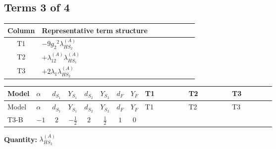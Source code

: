 \documentclass[8pt]{article}
\begin{document}
\begin{landscape}
\subsection*{Terms 3 of 4}
\begin{center}
\begin{tabular}{@{}c >{\raggedright\arraybackslash}p{0.82\linewidth}@{}}
\toprule
Column & Representative term structure \\
\midrule
T1 & \(\displaystyle -9 {g_2}^2 {\lambda_{HS_2}^{(A)}}\) \\
\midrule
T2 & \(\displaystyle +{\lambda_{12}^{(A)}} {\lambda_{HS_1}^{(A)}}\) \\
\midrule
T3 & \(\displaystyle +2 {\lambda_1} {\lambda_{HS_2}^{(A)}}\) \\
\midrule
\bottomrule
\end{tabular}
\end{center}
\smallskip
\tiny
\begin{longtable}{@{}llcccccc >{\raggedright\arraybackslash}p{0.21\linewidth} >{\raggedright\arraybackslash}p{0.21\linewidth} >{\raggedright\arraybackslash}p{0.21\linewidth}@{}}
\toprule
Model & $\alpha$ & $d_{S_1}$ & $Y_{S_1}$ & $d_{S_2}$ & $Y_{S_2}$ & $d_F$ & $Y_F$ & T1 & T2 & T3 \\
\midrule
\endfirsthead
\toprule
Model & $\alpha$ & $d_{S_1}$ & $Y_{S_1}$ & $d_{S_2}$ & $Y_{S_2}$ & $d_F$ & $Y_F$ & T1 & T2 & T3 \\
\midrule
\endhead
T3-B & $-1$ & $2$ & $-\frac{1}{2}$ & $2$ & $\frac{1}{2}$ & $1$ & $0$ & \scriptsize\adjustbox{max width=\linewidth}{$\begin{gathered} -9 {g_2}^2 {\lambda_{HS_2}^{(A)}}\end{gathered}$} & \scriptsize\adjustbox{max width=\linewidth}{$\begin{gathered} +{\lambda_{12}^{(A)}} {\lambda_{HS_1}^{(A)}}\end{gathered}$} & \scriptsize\adjustbox{max width=\linewidth}{$\begin{gathered} +2 {\lambda_1} {\lambda_{HS_2}^{(A)}}\end{gathered}$} \\
\midrule
\bottomrule
\end{longtable}
\clearpage
\noindent\textbf{Quantity: }$\lambda_{HS_2}^{(A)}$\par\smallskip

\end{landscape}
\end{document}
